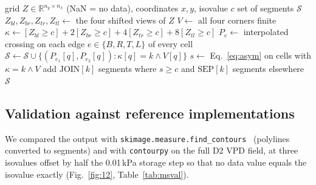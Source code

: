 \begin{algorithm}[!t]
\caption{Vectorised Marching Squares with asymptotic decider}
\label{alg:ms}
\begin{algorithmic}[1]
\REQUIRE grid $Z\in\mathbb{R}^{n_y\times n_x}$ (NaN = no data), coordinates $x,y$, isovalue $c$
\ENSURE set of segments $\mathcal{S}$
\STATE $Z_{bl},Z_{br},Z_{tr},Z_{tl}\leftarrow$ the four shifted views of $Z$ 
\STATE $V\leftarrow$ all four corners finite
\STATE $\kappa\leftarrow [Z_{bl}{\ge}c] + 2[Z_{br}{\ge}c] + 4[Z_{tr}{\ge}c] + 8[Z_{tl}{\ge}c]$
\STATE $P_e\leftarrow$ interpolated crossing on each edge $e\in\{B,R,T,L\}$ of every cell
    \STATE $\mathcal{S}\leftarrow\mathcal{S}\cup\{(P_{e_1}[q],P_{e_2}[q]) : \kappa[q]=k \wedge V[q]\}$
  \ENDFOR
\ENDFOR
{}
  \STATE $s\leftarrow$ Eq.~\eqref{eq:asym} on cells with $\kappa=k \wedge V$
  \STATE add $\mathrm{JOIN}[k]$ segments where $s\ge c$ and $\mathrm{SEP}[k]$ segments elsewhere
\ENDFOR
\RETURN $\mathcal{S}$
\end{algorithmic}
\end{algorithm}


\subsection{Validation against reference implementations}
We compared the output with \texttt{skimage.measure.find\_contours}~\cite{vanderwalt2014} (polylines converted to segments)
and with \texttt{contourpy} on the full D2 VPD field, at three isovalues offset by half the 0.01\,kPa storage step so that
no data value equals the isovalue exactly (Fig.~\ref{fig:12}, Table~\ref{tab:msval}).


